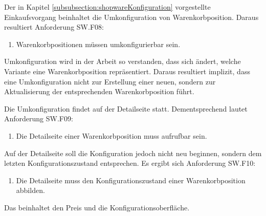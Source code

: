 \documentclass[11pt, a4paper, titlepage, listof=totoc, bibliography=totoc, index=totoc, twoside, openright, headings=normal]{scrreprt}
\begin{document}
Der in Kapitel \ref{subsubsection:shopwareKonfiguration} vorgestellte Einkaufsvorgang beinhaltet die Umkonfiguration von Warenkorbposition. Daraus resultiert Anforderung SW.F08: 
\begin{enumerate}[SW.F08:]\bfseries
\item Warenkorbpositionen müssen umkonfigurierbar sein.
\end{enumerate}
Umkonfiguration wird in der Arbeit so verstanden, dass sich ändert, welche Variante eine Warenkorbposition repräsentiert. Daraus resultiert implizit, dass eine Umkonfiguration nicht zur Erstellung einer neuen, sondern zur Aktualisierung der entsprechenden Warenkorbposition führt.

Die Umkonfiguration findet auf der Detailseite statt. Dementsprechend lautet Anforderung SW.F09: 
\begin{enumerate}[SW.F09:]\bfseries
\item Die Detailseite einer Warenkorbposition muss aufrufbar sein.
\end{enumerate}
Auf der Detailseite soll die Konfiguration jedoch nicht neu beginnen, sondern dem letzten Konfigurationszustand entsprechen. Es ergibt sich Anforderung SW.F10:
\begin{enumerate}[SW.F10:]\bfseries
\item Die Detailseite muss den Konfigurationszustand einer Warenkorbposition abbilden.
\end{enumerate}
Das beinhaltet den Preis und die Konfigurationsoberfläche.
\end{document}
